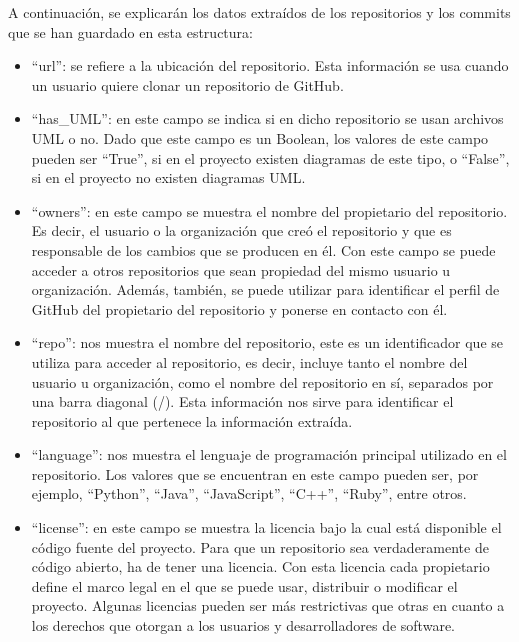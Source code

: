 \documentclass[a4paper, 12pt]{book}
\begin{document}
A continuación, se explicarán los datos extraídos de los repositorios y los commits que se han guardado en esta estructura:
\begin{itemize}

  \item ``url'': se refiere a la ubicación del repositorio.
  Esta información se usa cuando un usuario quiere clonar un repositorio de GitHub.

  \item ``has\_UML'': en este campo se indica si en dicho repositorio se usan archivos UML o no.
  Dado que este campo es un Boolean, los valores de este campo pueden ser ``True'', si en el proyecto existen diagramas de este tipo, o ``False'', si en el proyecto no existen diagramas UML.
  
  \item ``owners'': en este campo se muestra el nombre del propietario del repositorio. 
  Es decir, el usuario o la organización que creó el repositorio y que es responsable de los cambios que se producen en él. 
  Con este campo se puede acceder a otros repositorios que sean propiedad del mismo usuario u organización. 
  Además, también, se puede utilizar para identificar el perfil de GitHub del propietario del repositorio y ponerse en contacto con él.

  \item ``repo'': nos muestra el nombre del repositorio, este es un identificador que se utiliza para acceder al repositorio, es decir, incluye tanto el nombre del usuario u organización, como el nombre del repositorio en sí, separados por una barra diagonal (/).
  Esta información nos sirve para identificar el repositorio al que pertenece la información extraída.

  \item ``language'': nos muestra el lenguaje de programación principal utilizado en el repositorio.
  Los valores que se encuentran en este campo pueden ser, por ejemplo, ``Python'', ``Java'', ``JavaScript'', ``C++'', ``Ruby'', entre otros.
  
  \item ``license'': en este campo se muestra la licencia bajo la cual está disponible el código fuente del proyecto.
  Para que un repositorio sea verdaderamente de código abierto, ha de tener una licencia. 
  Con esta licencia cada propietario define el marco legal en el que se puede usar, distribuir o modificar el proyecto.
  Algunas licencias pueden ser más restrictivas que otras en cuanto a los derechos que otorgan a los usuarios y desarrolladores de software.
  

\end{itemize}
\end{document}
